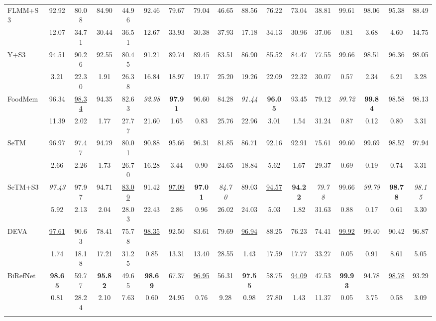 \documentclass[preprint,12pt]{elsarticle}
\begin{document}
\begin{table}[!htbp]
\begin{tabular}{lcccccccccccccccc}
FLMM+S3 & 92.92 & 80.08 & 84.90 & 44.96 & 92.46 & 79.67 & 79.04 & 46.65 & 88.56 & 76.22 & 73.04 & 38.81 & 99.61 & 98.06 & 95.38 & 88.49 \\
  & 12.07 & 34.71 & 30.44 & 36.51 & 12.67 & 33.93 & 30.38 & 37.93 & 17.18 & 34.13 & 30.96 & 37.06 & 0.81 & 3.68 & 4.60 & 14.75 \\ \addlinespace[3pt]
\rowcolor{gray!12}
Y+S3 & 94.51 & 90.26 & 92.55 & 80.45 & 91.21 & 89.74 & 89.45 & 83.51 & 86.90 & 85.52 & 84.47 & 77.55 & 99.66 & 98.51 & 96.36 & 98.05 \\
  & 3.21 & 22.30 & 1.91 & 26.38 & 16.84 & 18.97 & 19.17 & 25.20 & 19.26 & 22.09 & 22.32 & 30.07 & 0.57 & 2.34 & 6.21 & 3.28 \\ \addlinespace[3pt]
FoodMem & 96.34 & \uline{98.34} & 94.35 & 82.63 & \textit{92.98} & \textbf{97.91} & 96.60 & 84.28 & \textit{91.44} & \textbf{96.05} & 93.45 & 79.12 & \textit{99.72} & \textbf{99.84} & 98.58 & 98.13 \\
  & 11.39 & 2.02 & 1.77 & 27.77 & 21.60 & 1.65 & 0.83 & 25.76 & 22.96 & 3.01 & 1.54 & 31.24 & 0.87 & 0.12 & 0.80 & 3.31 \\ \addlinespace[3pt]
\rowcolor{gray!12}
SeTM & 96.97 & 97.47 & 94.79 & 80.01 & 90.88 & 95.66 & 96.31 & 81.85 & 86.71 & 92.16 & 92.91 & 75.61 & 99.60 & 99.69 & 98.52 & 97.94 \\
  & 2.66 & 2.26 & 1.73 & 26.70 & 16.28 & 3.44 & 0.90 & 24.65 & 18.84 & 5.62 & 1.67 & 29.37 & 0.69 & 0.19 & 0.74 & 3.31 \\ \addlinespace[3pt]
SeTM+S3 & \textit{97.43} & 97.97 & 94.71 & \uline{83.09} & 91.42 & \uline{97.09} & \textbf{97.01} & \textit{84.70} & 89.03 & \uline{94.57} & \textbf{94.22} & \textit{79.78} & 99.66 & \textit{99.79} & \textbf{98.78} & \textit{98.15} \\
  & 5.92 & 2.13 & 2.04 & 28.03 & 22.43 & 2.86 & 0.96 & 26.02 & 24.03 & 5.03 & 1.82 & 31.63 & 0.88 & 0.17 & 0.61 & 3.30 \\ \addlinespace[3pt]
\rowcolor{gray!12}
DEVA & \uline{97.61} & 90.63 & 78.41 & 75.78 & \uline{98.35} & 92.50 & 83.61 & 79.69 & \uline{96.94} & 88.25 & 76.23 & 74.41 & \uline{99.92} & 99.40 & 90.42 & 96.87 \\
  & 1.74 & 18.18 & 17.21 & 31.25 & 0.85 & 13.31 & 13.40 & 28.55 & 1.43 & 17.59 & 17.77 & 33.27 & 0.05 & 0.91 & 8.61 & 5.05 \\ \addlinespace[3pt]
BiRefNet & \textbf{98.65} & 59.77 & \textbf{95.82} & 49.65 & \textbf{98.69} & 67.37 & \uline{96.95} & 56.31 & \textbf{97.55} & 58.75 & \uline{94.09} & 47.53 & \textbf{99.93} & 94.78 & \uline{98.78} & 93.29 \\
  & 0.81 & 28.24 & 2.10 & 7.63 & 0.60 & 24.95 & 0.76 & 9.28 & 0.98 & 27.80 & 1.43 & 11.37 & 0.05 & 3.75 & 0.58 & 3.09 \\ \addlinespace[3pt]


\end{tabular}
\end{table}
\end{document}

